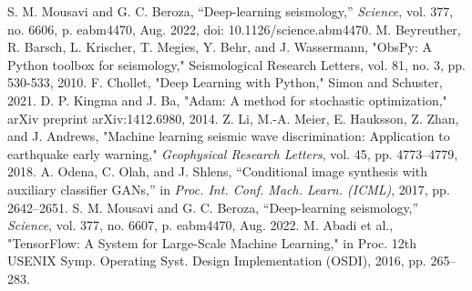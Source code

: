 \documentclass[conference]{IEEEtran}
\begin{document}
\begin{thebibliography}{00}
     S. M. Mousavi and G. C. Beroza, ``Deep-learning seismology,'' \emph{Science}, vol. 377, no. 6606, p. eabm4470, Aug. 2022, doi: 10.1126/science.abm4470.   
     M. Beyreuther, R. Barsch, L. Krischer, T. Megies, Y. Behr, and J. Wassermann, "ObsPy: A Python toolbox for seismology," Seismological Research Letters, vol. 81, no. 3, pp. 530-533, 2010.
     F. Chollet, "Deep Learning with Python," Simon and Schuster, 2021.
     D. P. Kingma and J. Ba, "Adam: A method for stochastic optimization," arXiv preprint arXiv:1412.6980, 2014.
     Z. Li, M.-A. Meier, E. Hauksson, Z. Zhan, and J. Andrews, "Machine learning seismic wave discrimination: Application to earthquake early warning," \emph{Geophysical Research Letters}, vol. 45, pp. 4773–4779, 2018.
     A. Odena, C. Olah, and J. Shlens, ``Conditional image synthesis with auxiliary classifier GANs,'' in \emph{Proc. Int. Conf. Mach. Learn. (ICML)}, 2017, pp. 2642--2651.
     S. M. Mousavi and G. C. Beroza, ``Deep-learning seismology,'' \emph{Science}, vol. 377, no. 6607, p. eabm4470, Aug. 2022.   %
     M. Abadi et al., "TensorFlow: A System for Large-Scale Machine Learning," in Proc. 12th USENIX Symp. Operating Syst. Design Implementation (OSDI), 2016, pp. 265--283.

\end{thebibliography}
\end{document}
